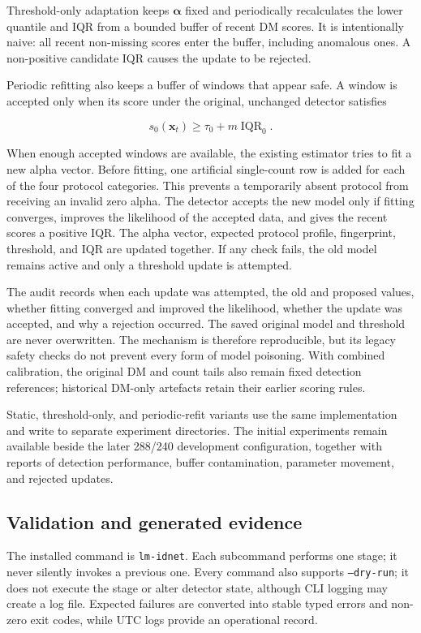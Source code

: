 Threshold-only adaptation keeps $\boldsymbol{\alpha}$ fixed and periodically
recalculates the lower quantile and IQR from a bounded buffer of recent DM scores.
It is intentionally naive: all recent non-missing scores enter the buffer,
including anomalous ones. A non-positive candidate IQR causes the update to be
rejected.

Periodic refitting also keeps a buffer of windows that appear safe. A window is
accepted only when its score under the original, unchanged detector satisfies

\[
s_0(\mathbf{x}_t)\geq
\tau_0+m\operatorname{IQR}_0.
\]

When enough accepted windows are available, the existing estimator tries to fit
a new alpha vector. Before fitting, one artificial single-count row is added for
each of the four protocol categories. This prevents a temporarily absent
protocol from receiving an invalid zero alpha. The detector accepts the new
model only if fitting converges, improves the likelihood of the accepted data,
and gives the recent scores a positive IQR. The alpha vector, expected protocol
profile, fingerprint, threshold, and IQR are updated together. If any check
fails, the old model remains active and only a threshold update is attempted.

The audit records when each update was attempted, the old and proposed values,
whether fitting converged and improved the likelihood, whether the update was
accepted, and why a rejection occurred. The saved original model and threshold
are never overwritten. The mechanism is therefore reproducible, but its legacy
safety checks do not prevent every form of model poisoning. With combined
calibration, the original DM and count tails also remain fixed detection
references; historical DM-only artefacts retain their earlier scoring rules.

Static, threshold-only, and periodic-refit variants use the same implementation
and write to separate experiment directories. The initial experiments remain
available beside the later 288/240 development configuration, together with
reports of detection performance, buffer contamination, parameter movement, and
rejected updates.

\subsection{Validation and generated evidence}

The installed command is \texttt{lm-idnet}. Each subcommand performs one stage;
it never silently invokes a previous one. Every command also supports \texttt{--dry-run}; it does not execute the stage
or alter detector state, although CLI logging may create a log file. Expected failures are converted into stable
typed errors and non-zero exit codes, while UTC logs provide an operational
record.

